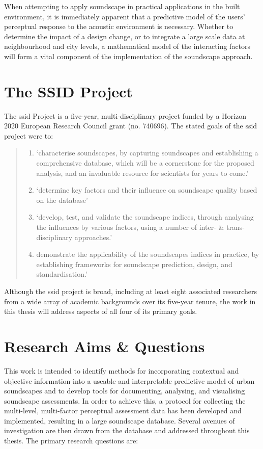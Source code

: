 When attempting to apply soundscape in practical applications in the built environment, it is immediately apparent that a predictive model of the users' perceptual response to the acoustic environment is necessary. Whether to determine the impact of a design change, or to integrate a large scale data at neighbourhood and city levels, a mathematical model of the interacting factors will form a vital component of the implementation of the soundscape approach. 


\section{The SSID Project}
The \gls{ssid} Project is a five-year, multi-disciplinary project funded by a Horizon 2020 European Research Council grant (no. 740696). The stated goals of the \gls{ssid} project  were to:

\begin{quote}
\begin{enumerate}
  \item `characterise soundscapes, by capturing soundscapes and establishing a comprehensive database, which will be a cornerstone for the proposed analysis, and an invaluable resource for scientists for years to come.'
  \item `determine key factors and their influence on soundscape quality based on the database'
  \item `develop, test, and validate the soundscape indices, through analysing the influences by various factors, using a number of inter- \& trans-disciplinary approaches.'
  \item demonstrate the applicability of the soundscapes indices in practice, by establishing frameworks for soundscape prediction, design, and standardisation.'
\end{enumerate}
\end{quote}

Although the \gls{ssid} project is broad, including at least eight associated researchers from a wide array of academic backgrounds over its five-year tenure, the work in this thesis will address aspects of all four of its primary goals. 

\section{Research Aims \& Questions}
This work is intended to identify methods for incorporating contextual and objective information into a useable and interpretable predictive model of urban soundscapes and to develop tools for documenting, analysing, and visualising soundscape assessments. In order to achieve this, a protocol for collecting the multi-level, multi-factor perceptual assessment data has been developed and implemented, resulting in a large soundscape database. Several avenues of investigation are then drawn from the database and addressed throughout this thesis. The primary research questions are:


